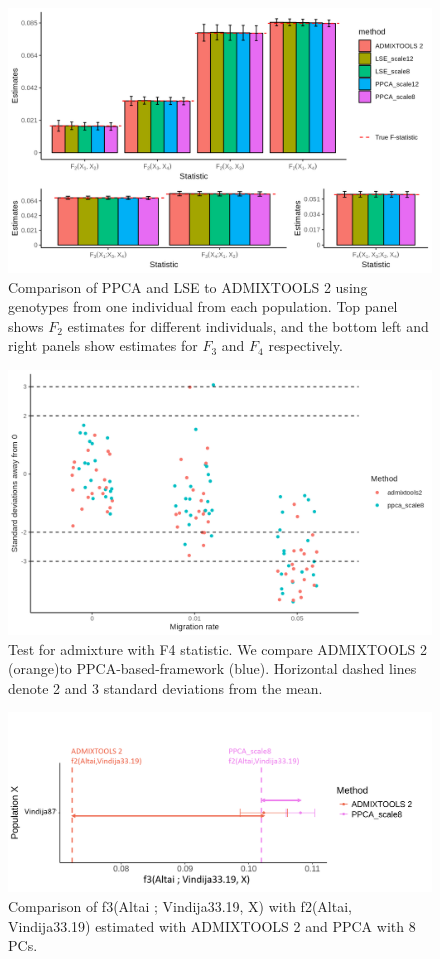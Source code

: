 \documentclass[12pt, letterpaper]{article}
\begin{document}
\begin{figure}[ht!]
    \includegraphics[width=16.5cm]{Images/Supplement/mu0.05_plot_all_1ind.png}
    \centering
    \caption{Comparison of PPCA and LSE to ADMIXTOOLS 2 using genotypes from one individual from each population. Top panel shows $F_2$ estimates for different individuals, and the bottom left and right panels show estimates for $F_3$ and $F_4$ respectively.}
    \label{figS2:pc_scale}
\end{figure}

\begin{figure}[ht!]
    \includegraphics[width=16.5cm]{Images/Supplement/hypothesis_test_comparison.png}
    \centering
    \caption{Test for admixture with F4 statistic. We compare ADMIXTOOLS 2 (orange)to PPCA-based-framework (blue). Horizontal dashed lines denote 2 and 3 standard deviations from the mean.} 
    \label{figS2:pc_scale}
\end{figure}

\begin{figure}[ht!]
    \includegraphics[width=16.5cm]{Images/Supplement/f2_f3_plot.png}
    \centering
    \caption{Comparison of f3(Altai ; Vindija33.19, X) with f2(Altai, Vindija33.19) estimated with ADMIXTOOLS 2 and PPCA with 8 PCs.} 
    \label{figS2:pc_scale}
\end{figure}
\end{document}
